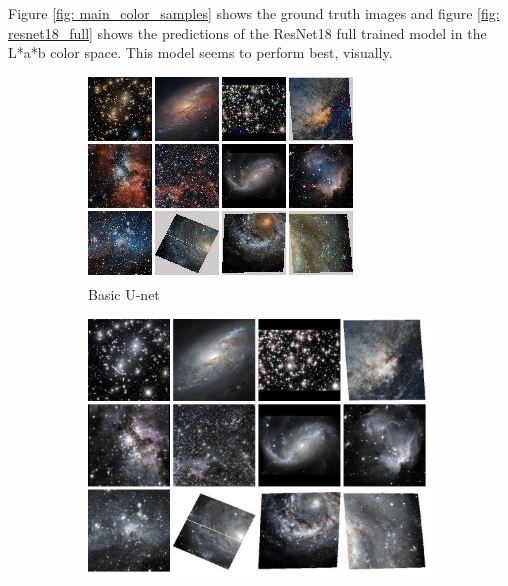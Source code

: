 \documentclass{article} %
\begin{document}
    Figure \ref{fig: main_color_samples} shows the ground truth images and figure \ref{fig: resnet18_full} shows the predictions of the ResNet18 full trained model in the L*a*b color space. This model seems to perform best, visually. 
    
    \begin{figure}[!htb]
    	\centering
    	\begin{subfigure}[t]{0.3\textwidth}
    		\centering
    		\includegraphics[width=\textwidth]{figures/samples_pix2pix}
    		\caption{Basic U-net}
    		\label{fig: u-net_samples}
    	\end{subfigure}
    	\begin{subfigure}[t]{0.3\textwidth}
    		\centering
    		\includegraphics[width=\textwidth]{figures/samples_pre-trained}

\end{subfigure}
\end{figure}
\end{document}
